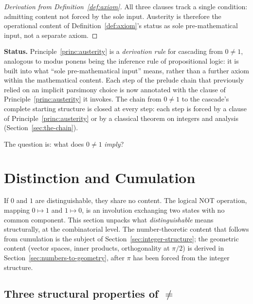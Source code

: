 \documentclass[11pt,a4paper]{article}
\begin{document}
\begin{proof}[Derivation from Definition~\ref{def:axiom}]
All three clauses track a single condition: admitting content not forced
by the sole input. Austerity is therefore the operational content of
Definition~\ref{def:axiom}'s status as sole pre-mathematical input, not
a separate axiom.
\end{proof}

\noindent\textbf{Status.} Principle~\ref{princ:austerity} is a
\emph{derivation rule} for cascading from $0\neq 1$, analogous to
modus ponens being the inference rule of propositional logic: it is
built into what ``sole pre-mathematical input'' means, rather than a
further axiom within the mathematical content. Each step of the prelude
chain that previously relied on an implicit parsimony choice is now
annotated with the clause of Principle~\ref{princ:austerity} it invokes.
The chain from $0\neq 1$ to the cascade's complete starting structure
is closed at every step: each step is forced by a clause of
Principle~\ref{princ:austerity} or by a classical theorem on integers
and analysis (Section~\ref{sec:the-chain}).

The question is: what does $0\neq 1$ \emph{imply}?

\section{Distinction and Cumulation}\label{sec:distinction-and-cumulation}

If $0$ and $1$ are distinguishable, they share no content. The
logical NOT operation, mapping $0\mapsto 1$ and $1\mapsto 0$, is an
involution exchanging two states with no common component. This
section unpacks what \emph{distinguishable} means structurally, at
the combinatorial level. The number-theoretic content that follows
from cumulation is the subject of
Section~\ref{sec:integer-structure}; the geometric content (vector
spaces, inner products, orthogonality at $\pi/2$) is derived in
Section~\ref{sec:numbers-to-geometry}, after $\pi$ has been forced from
the integer structure.

\subsection*{Three structural properties of $\neq$}
\end{document}
